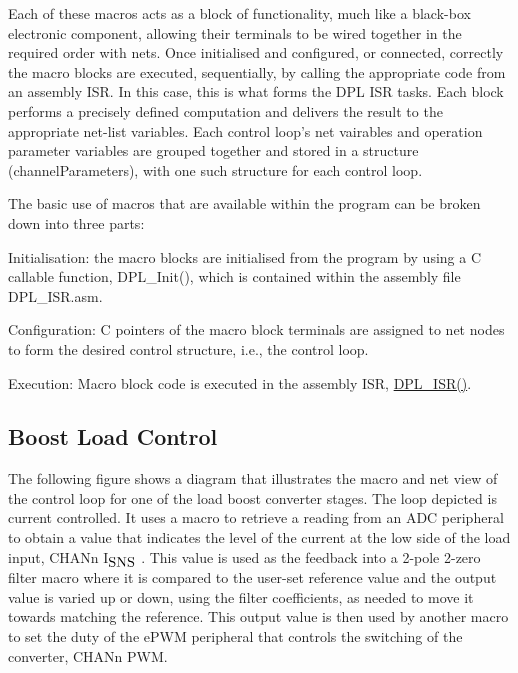 Each of these macros acts as a block of functionality, much like a black-\/box electronic component, allowing their terminals to be wired together in the required order with nets. Once initialised and configured, or connected, correctly the macro blocks are executed, sequentially, by calling the appropriate code from an assembly I\-S\-R. In this case, this is what forms the D\-P\-L I\-S\-R tasks. Each block performs a precisely defined computation and delivers the result to the appropriate net-\/list variables. Each control loop's net vairables and operation parameter variables are grouped together and stored in a structure (channel\-Parameters), with one such structure for each control loop.

The basic use of macros that are available within the program can be broken down into three parts\-:
\begin{DoxyEnumerate}
\item Initialisation\-: the macro blocks are initialised from the program by using a C callable function, D\-P\-L\-\_\-\-Init(), which is contained within the assembly file D\-P\-L\-\_\-\-I\-S\-R.\-asm.
\item Configuration\-: C pointers of the macro block terminals are assigned to net nodes to form the desired control structure, i.\-e., the control loop.
\item Execution\-: Macro block code is executed in the assembly I\-S\-R, \hyperlink{a00038_a5532a53363218854b0e4b15049d773f7}{D\-P\-L\-\_\-\-I\-S\-R()}.
\end{DoxyEnumerate}\hypertarget{index_blctrl}{}\subsection{Boost Load Control}\label{index_blctrl}
The following figure shows a diagram that illustrates the macro and net view of the control loop for one of the load boost converter stages. The loop depicted is current controlled. It uses a macro to retrieve a reading from an A\-D\-C peripheral to obtain a value that indicates the level of the current at the low side of the load input, C\-H\-A\-Nn I$_{\mbox{S\-N\-S}}$ . This value is used as the feedback into a 2-\/pole 2-\/zero filter macro where it is compared to the user-\/set reference value and the output value is varied up or down, using the filter coefficients, as needed to move it towards matching the reference. This output value is then used by another macro to set the duty of the e\-P\-W\-M peripheral that controls the switching of the converter, C\-H\-A\-Nn P\-W\-M.

